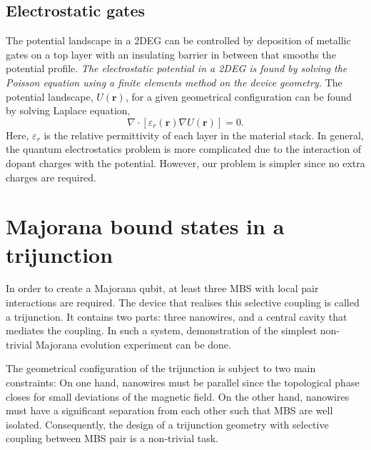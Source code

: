 \subsection{Electrostatic gates}

The potential landscape in a 2DEG can be controlled by deposition of metallic gates on a top layer with an insulating barrier in between that smooths the potential profile\cite{Antipov2018}.
\textit{The electrostatic potential in a 2DEG is found by solving the Poisson equation using a finite elements method on the device geometry.}
The potential landscape, $U(\mathbf{r})$, for a given geometrical configuration can be found by solving Laplace equation,
\begin{equation}\label{eq: laplace}
\nabla \cdot \left[ \varepsilon_r(\mathbf{r}) \nabla U(\mathbf{r}) \right] = 0.
\end{equation}
Here, $\varepsilon_r$ is the relative permittivity of each layer in the material stack.
In general, the quantum electrostatics problem is more complicated due to the interaction of dopant charges with the potential.
However, our problem is simpler since no extra charges are required.


\section{Majorana bound states in a trijunction}

In order to create a Majorana qubit, at least three MBS with local pair interactions are required\cite{Alicea2011}.
The device that realises this selective coupling is called a trijunction.
It contains two parts: three nanowires, and a central cavity that mediates the coupling.
In such a system, demonstration of the simplest non-trivial Majorana evolution experiment can be done.

The geometrical configuration of the trijunction is subject to two main constraints:
On one hand, nanowires must be parallel since the topological phase closes for small deviations of the magnetic field.
On the other hand, nanowires must have a significant separation from each other such that MBS are well isolated.
Consequently, the design of a trijunction geometry with selective coupling between MBS pair is a non-trivial task.

